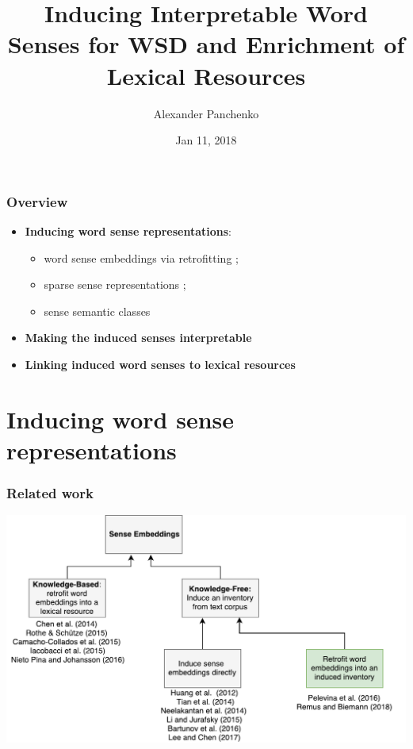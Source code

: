 \documentclass{beamer}
\title{Inducing Interpretable Word Senses for WSD and Enrichment of Lexical Resources}
\author{Alexander Panchenko} %
\date[11.02.2018]{Jan 11, 2018}
\begin{document}
\maketitle

\begin{frame}
  \frametitle{Overview}

  \begin{itemize}
		\item \textbf{Inducing word sense representations}:
		\begin{itemize}
		\item word sense embeddings via retrofitting \cite{pelevina-EtAl:2016:RepL4NLP,remus:2018};
		\item sparse sense representations \cite{panchenko-EtAl:2017:EACLlong};
		\item sense semantic classes \cite{panchenko:2018:SemanticClasses} 
		\end{itemize}
		
	\pause 
	\vspace{1em}
	\item \textbf{Making the induced senses interpretable} \cite{panchenko-EtAl:2017:EMNLP2017Demos,panchenko-EtAl:2017:EACLlong}
	
	\pause
	\vspace{1em}
	\item \textbf{Linking induced word senses to lexical resources}~\cite{faralli2016linked,panchenko-EtAl:2017:SENSE2017,biemann2018framework}	
			
\end{itemize}
	
\end{frame}

\section{Inducing word sense representations}


\begin{frame}[fragile]
\frametitle{Related work}
\begin{center}
 \includegraphics[height=0.56\textwidth]{sense_embeddings}
 \end{center}
\end{frame}
\end{document}
